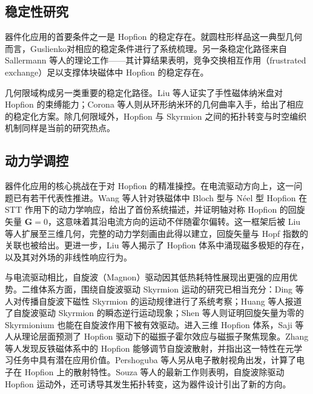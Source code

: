 \subsection{稳定性研究}

器件化应用的首要条件之一是 Hopfion 的稳定存在。就圆柱形样品这一典型几何而言，Guslienko\cite{guslienko2024review}对相应的稳定条件进行了系统梳理。另一条稳定化路径来自 Sallermann 等人\cite{sallermann2023stability}的理论工作——其计算结果表明，竞争交换相互作用（frustrated exchange）足以支撑体块磁体中 Hopfion 的稳定存在。

几何限域构成另一类重要的稳定化路径。Liu 等人\cite{liu2018binding}证实了手性磁体纳米盘对 Hopfion 的束缚能力；Corona 等人\cite{corona2023curvature}则从环形纳米环的几何曲率入手，给出了相应的稳定化方案。除几何限域外，Hopfion 与 Skyrmion 之间的拓扑转变\cite{gao2024topological,souza2025topological}与时空编织机制\cite{knapman2024spacetime}同样是当前的研究热点。

\subsection{动力学调控}

器件化应用的核心挑战在于对 Hopfion 的精准操控。在电流驱动方向上，这一问题已有若干代表性推进。Wang 等人\cite{wang2019current}针对铁磁体中 Bloch 型与 N\'{e}el 型 Hopfion 在 STT 作用下的动力学响应，给出了首份系统描述，并证明轴对称 Hopfion 的回旋矢量 $\mathbf{G} = 0$，这意味着其沿电流方向的运动不伴随霍尔偏转。这一框架后被 Liu 等人\cite{liu2020three}扩展至三维几何，完整的动力学刻画由此得以建立，回旋矢量与 Hopf 指数的关联也被给出。更进一步，Liu 等人\cite{liu2022emergent}揭示了 Hopfion 体系中涌现磁多极矩的存在，以及其对外场的非线性响应行为。

与电流驱动相比，自旋波（Magnon）驱动因其低热耗特性展现出更强的应用优势。二维体系方面，围绕自旋波驱动 Skyrmion 运动的研究已相当充分：Ding 等人\cite{ding2015motion}对传播自旋波下磁性 Skyrmion 的运动规律进行了系统考察；Huang 等人\cite{huang2023transient}报道了自旋波驱动 Skyrmion 的瞬态逆行运动现象；Shen 等人\cite{shen2018skyrmionium}则证明回旋矢量为零的 Skyrmionium 也能在自旋波作用下被有效驱动。进入三维 Hopfion 体系，Saji 等人\cite{saji2023magnonic}从理论层面预测了 Hopfion 驱动下的磁振子霍尔效应与磁振子聚焦现象。Zhang 等人\cite{zhang2023magnon}发现反铁磁体系中的 Hopfion 能够调节自旋波散射，并指出这一特性在元学习任务中具有潜在应用价值。Pershoguba 等人\cite{pershoguba2021electronic}另从电子散射视角出发，计算了电子在 Hopfion 上的散射特性。Souza 等人\cite{souza2025topological}的最新工作则表明，自旋波除驱动 Hopfion 运动外，还可诱导其发生拓扑转变，这为器件设计引出了新的方向。


